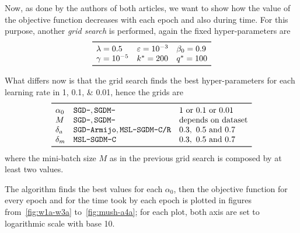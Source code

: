 Now, as done by the authors of both articles, we want to show how the value of the objective function decreases with each epoch and also during time. For this purpose, another \emph{grid search} is performed, again the fixed hyper-parameters are
\[
\begin{array}{lll}
\toprule
\lambda=0.5 & \epsilon=\num{e-3} & \beta_0=0.9 \\
\gamma=\num{e-5} & k^\ast=200 & q^\ast=100 \\
\bottomrule
\end{array}
\]

What differs now is that the grid search finds the best hyper-parameters for each learning rate in \numlist{1; 0.1; 0.01}, hence the grids are
\[
\begin{array}{lll}
\toprule
\alpha_0 & \text{\texttt{SGD-}}, \text{\texttt{SGDM-}} & \text{\numlist[list-separator={ or },list-final-separator={ or }]{1;0.1;0.01}} \\
M & \text{\texttt{SGD-}}, \text{\texttt{SGDM-}} & \text{depends on dataset} \\
\delta_a & \text{\texttt{SGD-Armijo}}, \text{\texttt{MSL-SGDM-C/R}} & \numlist{0.3;0.5;0.7} \\
\delta_m & \text{\texttt{MSL-SGDM-C}} & \numlist{0.3; 0.5; 0.7} \\
\bottomrule
\end{array}
\]
where the mini-batch size $M$ as in the previous grid search is composed by at least two values.

The algorithm finds the best values for each $\alpha_0$, then the objective function for every epoch and for the time took by each epoch is plotted in figures from~\vref{fig:w1a-w3a} to~\ref{fig:mush-a4a}; for each plot, both axis are set to logarithmic scale with base 10.

